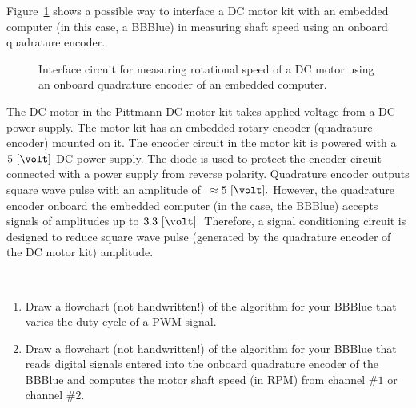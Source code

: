 %
Figure~\ref{fig:rotaryEncoderInterface} shows a possible way to interface  a DC motor kit with an embedded computer (in this case, a BBBlue) in measuring shaft speed using an onboard quadrature encoder. %
%
\begin{figure}
  \centering
  \caption[DC motor interface circuit with embedded computer.]{Interface circuit for measuring rotational speed of a DC motor using an onboard quadrature encoder of an embedded computer.  }
  \label{fig:rotaryEncoderInterface}
\end{figure}
%
The DC motor in the Pittmann DC motor kit takes applied voltage from a DC power supply. The motor kit has an embedded rotary encoder (quadrature encoder) mounted on it. The encoder circuit in the motor kit is powered with a $5~[\volt]$ DC power supply. The diode is used to protect the encoder circuit connected with a power supply from reverse polarity. Quadrature encoder outputs square wave pulse with an amplitude of $~\approx 5~[\volt].$ However, the quadrature encoder onboard the embedded computer (in the case, the BBBlue) accepts signals of amplitudes up to  $3.3~[\volt].$ Therefore, a signal conditioning circuit is designed to reduce square wave pulse  (generated by the quadrature encoder of the DC motor kit) amplitude.  

\begin{prelab}
  ~

  \begin{enumerate}
  \item Draw a flowchart (not handwritten!)  of the algorithm for your BBBlue that varies the duty cycle of a PWM signal.
    
  \item Draw a flowchart (not handwritten!)  of the algorithm for your BBBlue that reads digital signals entered into the onboard quadrature encoder  of the BBBlue and computes the motor shaft speed (in RPM) from channel $\#1$ or channel $\#2.$ 
  \end{enumerate}
\end{prelab}

